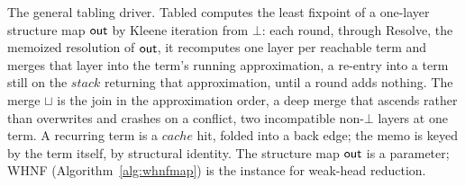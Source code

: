 \begin{algorithm*}
  \DontPrintSemicolon
  \caption{The general tabling driver. \textsf{Tabled} computes the least fixpoint of a one-layer structure map $\outm$ by Kleene iteration from $\bot$: each round, through \textsf{Resolve}, the memoized resolution of $\outm$, it recomputes one layer per reachable term and merges that layer into the term's running approximation, a re-entry into a term still on the $\mathit{stack}$ returning that approximation, until a round adds nothing. The merge $\sqcup$ is the join in the approximation order, a deep merge that ascends rather than overwrites and crashes on a conflict, two incompatible non-$\bot$ layers at one term. A recurring term is a $\mathit{cache}$ hit, folded into a back edge; the memo is keyed by the term itself, by structural identity. The structure map $\outm$ is a parameter; \textsf{WHNF} (Algorithm~\ref{alg:whnfmap}) is the instance for weak-head reduction.}
  \label{alg:whnf}
\end{algorithm*}

